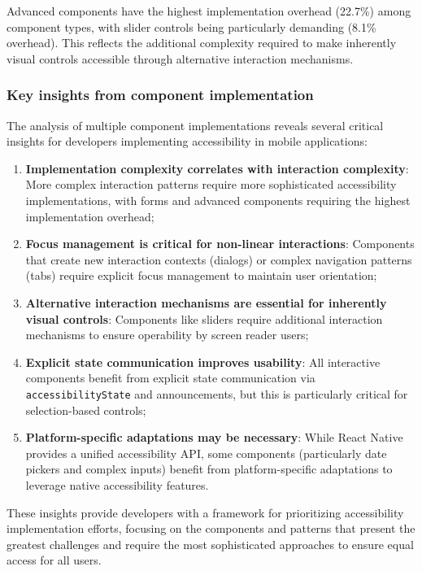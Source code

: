Advanced components have the highest implementation overhead (22.7\%) among component types, with slider controls being particularly demanding (8.1\% overhead). This reflects the additional complexity required to make inherently visual controls accessible through alternative interaction mechanisms.

\subsubsection{Key insights from component implementation}
\label{subsubsec:component-insights}

The analysis of multiple component implementations reveals several critical insights for developers implementing accessibility in mobile applications:

\begin{enumerate}
    \item \textbf{Implementation complexity correlates with interaction complexity}: More complex interaction patterns require more sophisticated accessibility implementations, with forms and advanced components requiring the highest implementation overhead;
    
    \item \textbf{Focus management is critical for non-linear interactions}: Components that create new interaction contexts (dialogs) or complex navigation patterns (tabs) require explicit focus management to maintain user orientation;
    
    \item \textbf{Alternative interaction mechanisms are essential for inherently visual controls}: Components like sliders require additional interaction mechanisms to ensure operability by screen reader users;
    
    \item \textbf{Explicit state communication improves usability}: All interactive components benefit from explicit state communication via \texttt{accessibilityState} and announcements, but this is particularly critical for selection-based controls;
    
    \item \textbf{Platform-specific adaptations may be necessary}: While React Native provides a unified accessibility API, some components (particularly date pickers and complex inputs) benefit from platform-specific adaptations to leverage native accessibility features.
\end{enumerate}

These insights provide developers with a framework for prioritizing accessibility implementation efforts, focusing on the components and patterns that present the greatest challenges and require the most sophisticated approaches to ensure equal access for all users.

